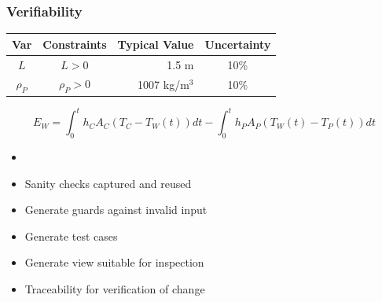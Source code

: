 \documentclass{beamer}
\begin{document}
\begin{frame}

\frametitle{Verifiability}

\begin{table} 
\centering
\begin{tabular}{c c r c } 
\toprule
\textbf{Var} & \textbf{Constraints} & \textbf{Typical Value} & \textbf{Uncertainty}\\ \midrule
$L$ & $L > 0$ & 1.5 m & 10\% \\ 
$\rho_P$ & $\rho_P > 0$	& 1007 kg/m$^3$	& 10\% \\
\bottomrule
\end{tabular}
\label{tab:pcm}
\end{table}

\begin{equation*}
E_W = \int_{0}^{t} h_C A_C (T_C - T_W(t)) dt - \int_{0}^{t} h_P A_P (T_W(t) - T_P(t)) dt
\end{equation*}

\begin{itemize}
\item {}
\item Sanity checks captured and reused
\item Generate guards against invalid input
\item Generate test cases
\item Generate view suitable for inspection
\item Traceability for verification of change
\end{itemize}
\end{frame}

\end{document}
